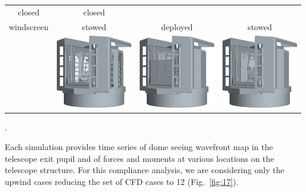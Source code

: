 \documentclass[]{AO4ELT}  %
\begin{document}
\begin{itemize}
\begin{tabular}{cccc}
            closed                                                        &
            closed                                                                                                                         \\
            windscreen                                                    & stowed                                                       &
            deployed                                                      &
            stowed                                                                                                                         \\
                                                                          & \includegraphics[width=0.2\linewidth]{zen30az000_OS7_tr.png} &
            \includegraphics[width=0.2\linewidth]{zen30az000_CD12_tr.png} &
            \includegraphics[width=0.2\linewidth]{zen60az000_CS17_tr.png}
         \end{tabular}.
\end{itemize}
Each simulation provides time series of dome seeing wavefront map in the telescope exit pupil and of forces and moments at various locations on the telescope structure.
For this compliance analysis, we are considering only the upwind cases reducing the set of CFD cases to 12 (Fig.~\ref{fig:17}).
\end{document}
